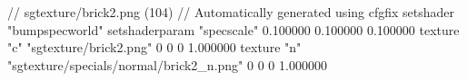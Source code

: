 // sgtexture/brick2.png (104)
// Automatically generated using cfgfix
setshader "bumpspecworld"
setshaderparam "specscale" 0.100000 0.100000 0.100000
texture "c" "sgtexture/brick2.png" 0 0 0 1.000000
texture "n" "sgtexture/specials/normal/brick2_n.png" 0 0 0 1.000000
